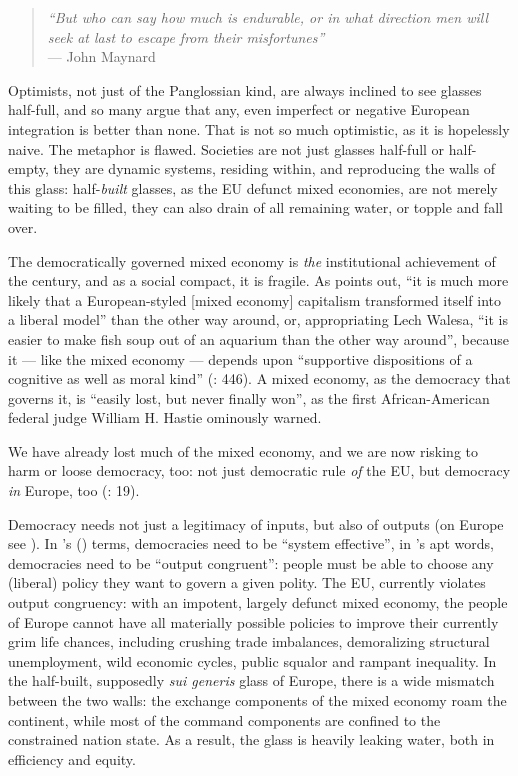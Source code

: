 \begin{quote}
	\emph{``But who can say how much is endurable, or in what direction men will seek at last to escape from their misfortunes''}\\
	--- John Maynard \cite{Keynes1936}
\end{quote}

Optimists, not just of the Panglossian kind, are always inclined to see glasses half-full, and so many argue that any, even imperfect or negative European integration is better than none.  That is not so much optimistic, as it is hopelessly naive. The metaphor is flawed. Societies are not just glasses half-full or half-empty, they are dynamic systems, residing within, and reproducing the walls of this glass: half-\emph{built} glasses, as the \gls{EU} defunct mixed economies, are not merely waiting to be filled, they can also drain of all remaining water, or topple and fall over.

The democratically governed mixed economy is \emph{the} institutional achievement of the century, and as a social compact, it is fragile. As \citeauthor{Offe2003} points out, ``it is much more likely that a European-styled [mixed economy] capitalism transformed itself into a liberal model'' than the other way around, or, appropriating Lech Walesa, ``it is easier to make fish soup out of an aquarium than the other way around'', because it --- like the mixed economy --- depends upon ``supportive dispositions of a cognitive as well as moral kind'' (\citeyear{Offe2003}: 446). A mixed economy, as the democracy that governs it, is ``easily lost, but never finally won'', as the first African-American federal judge William H. Hastie ominously warned. 

We have already lost much of the mixed economy, and we are now risking to harm or loose democracy, too: not just democratic rule \emph{of} the \gls{EU}, but democracy \emph{in} Europe, too (\citealt{Scharpf1997}: 19).

Democracy needs not just a legitimacy of inputs, but also of outputs (on Europe see \citealt{SchaGove1999}). In \citeauthor{Dahl-1994-ab}'s (\citeyear{Dahl-1994-ab}) terms, democracies need to be ``system effective'', in \citeauthor{Zurn-2000-aa}'s \citeyearpar{Zurn-2000-aa} apt words, democracies need to be ``output congruent'': people must be able to choose any (liberal) policy they want to govern a given polity. The \gls{EU}, currently violates output congruency: with an impotent, largely defunct mixed economy, the people of Europe cannot have all materially possible policies to improve their currently grim life chances, including crushing trade imbalances, demoralizing structural unemployment, wild economic cycles, public squalor and rampant inequality. In the half-built, supposedly \emph{sui generis} glass of Europe, there is a wide mismatch between the two walls: the exchange components of the mixed economy roam the continent, while most of the command components are confined to the constrained nation state. As a result, the glass is heavily leaking water, both in efficiency and equity.

